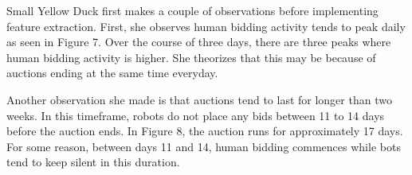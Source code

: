 \documentclass{article} %
\begin{document}
Small Yellow Duck first makes a couple of observations before implementing feature extraction.
First, she observes human bidding activity tends to peak daily as seen in Figure 7. %
Over the course of three days, there are three peaks where human bidding activity is higher.
She theorizes that this may be because of auctions ending at the same time everyday.


\begin{figure}[h]
\centering
{}
\end{figure}

Another observation she made is that auctions tend to last for longer than two weeks.
In this timeframe, robots do not place any bids between 11 to 14 days before the auction ends.
In Figure 8, the auction runs for approximately 17 days. %
For some reason, between days 11 and 14, human bidding commences while bots tend to keep silent in this duration.

\begin{figure}[h]
\centering
{}
\end{figure}
\end{document}
